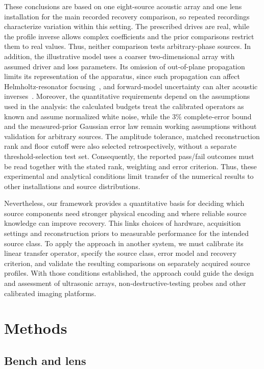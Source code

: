 \documentclass[lineno,pdflatex,sn-nature]{sn-jnl}%
\theoremstyle{thmstyleone}%
\theoremstyle{thmstyletwo}%
\theoremstyle{thmstylethree}%
\begin{document}
These conclusions are based on one eight-source acoustic array and one lens installation for the main recorded recovery comparison, so repeated recordings characterize variation within this setting. The prescribed drives are real, while the profile inverse allows complex coefficients and the prior comparisons restrict them to real values. Thus, neither comparison tests arbitrary-phase sources. In addition, the illustrative model uses a coarser two-dimensional array with assumed driver and loss parameters. Its omission of out-of-plane propagation limits its representation of the apparatus, since such propagation can affect Helmholtz-resonator focusing~\cite{basham2024}, and forward-model uncertainty can alter acoustic inverses~\cite{gilquin2019}. Moreover, the quantitative requirements depend on the assumptions used in the analysis: the calculated budgets treat the calibrated operators as known and assume normalized white noise, while the $3\%$ complete-error bound and the measured-prior Gaussian error law remain working assumptions without validation for arbitrary sources. The amplitude tolerance, matched reconstruction rank and floor cutoff were also selected retrospectively, without a separate threshold-selection test set. Consequently, the reported pass/fail outcomes must be read together with the stated rank, weighting and error criterion. Thus, these experimental and analytical conditions limit transfer of the numerical results to other installations and source distributions.

Nevertheless, our framework provides a quantitative basis for deciding which source components need stronger physical encoding and where reliable source knowledge can improve recovery. This links choices of hardware, acquisition settings and reconstruction priors to measurable performance for the intended source class. To apply the approach in another system, we must calibrate its linear transfer operator, specify the source class, error model and recovery criterion, and validate the resulting comparisons on separately acquired source profiles. With those conditions established, the approach could guide the design and assessment of ultrasonic arrays, non-destructive-testing probes and other calibrated imaging platforms.

\section{Methods}

\subsection{Bench and lens}
\end{document}
